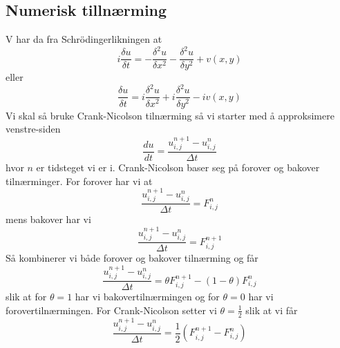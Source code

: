 \documentclass[reprint,english,notitlepage]{revtex4-2}  %
\begin{document}
\subsection{Numerisk tillnærming} 
V har da fra Schrödingerlikningen at
$$
i\frac{\delta u}{\delta t}=-\frac{\delta^2 u}{\delta x^2}-\frac{\delta^2 u}{\delta y^2}+v(x,y)
$$
eller 
$$
\frac{\delta u}{\delta t}=i\frac{\delta^2 u}{\delta x^2}+i\frac{\delta^2 u}{\delta y^2}-iv(x,y)
$$
Vi skal så bruke Crank-Nicolson tilnærming så vi starter med å approksimere venstre-siden
$$
\frac{d u}{dt}=\frac{u^{n+1}_{i,j}-u^{n}_{i,j}}{\Delta t}
$$
hvor $n$ er tidsteget vi er i.
Crank-Nicolson baser seg på forover og bakover tilnærminger. For forover har vi at
$$
\frac{u^{n+1}_{i,j}-u^{n}_{i,j}}{\Delta t}=F^{n}_{i,j}
$$ 
mens bakover har vi
$$
\frac{u^{n+1}_{i,j}-u^{n}_{i,j}}{\Delta t}=F^{n+1}_{i,j}
$$
Så kombinerer vi både forover og bakover tilnærming og får
$$
\frac{u^{n+1}_{i,j}-u^n_{i,j}}{\Delta t}=\theta F^{n+1}_{i,j}-(1-\theta)F^{n}_{i,j}
$$
slik at for $\theta=1$ har vi bakovertilnærmingen og for $\theta=0$ har vi forovertilnærmingen.
For Crank-Nicolson setter vi $\theta =\frac{1}{2}$ slik at vi får
$$
\frac{u^{n+1}_{i,j}-u^n_{i,j}}{\Delta t}=\frac{1}{2}(F^{n+1}_{i,j}-F^{n}_{i,j})
$$
\end{document}
